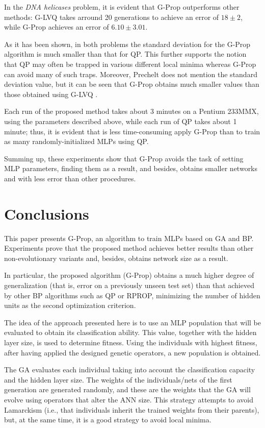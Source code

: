 \documentclass{elsart}
\begin{document}
In the \emph{DNA helicases} problem, it is evident that G-Prop outperforms other methods: G-LVQ \cite{heliNPL} takes arround 20 generations to achieve an error of $18 \pm 2$, while G-Prop  achieves an error of $6.10 \pm 3.01$.

As it has been shown, in both problems the standard deviation for the G-Prop algorithm is much smaller than that for QP. This further supports the notion that QP may often be trapped in various different local minima whereas G-Prop can avoid many of such traps. Moreover, Prechelt \cite{Prechelt94c} does not mention the standard deviation value, but it can be seen that G-Prop obtains much smaller values than those obtained using G-LVQ \cite{heliNPL}.

Each run of the proposed method takes about 3 minutes on a Pentium 233MMX, using the parameters described above, while each run of QP takes about 1 minute; thus, it is evident that is less time-consuming apply G-Prop than to train as many randomly-initialized MLPs using QP.

Summing up, these experiments show that G-Prop avoids the task of setting MLP parameters, finding them as a result, and besides, obtains smaller networks and with less error than other procedures.

\section{Conclusions}
\label{sec:conclus}


This paper presents G-Prop, an algorithm to train MLPs based on GA and BP. Experiments prove that the proposed method achieves better results than other non-evolutionary variants and, besides, obtains network size as a result.

In particular, the proposed algorithm (G-Prop) obtains a much higher degree of generalization (that is, error on a previously unseen test set) than that achieved by other BP algorithms such as QP or RPROP, minimizing the number of hidden units as the second optimization criterion.

The idea of the approach presented here is to use an MLP population that will be evaluated to obtain its classification ability. This value, together with the hidden layer size, is used to determine fitness. Using the individuals with highest fitness, after having applied the designed genetic operators, a new population is obtained.

The GA evaluates each individual taking into account the classification capacity and the hidden layer size. The weights of the individuals/nets of the first generation are generated randomly, and these are the weights that the GA will evolve using operators that alter the ANN size. 
This strategy attempts to avoid Lamarckism (i.e., that individuals inherit the trained weights from their parents), but, at the same time, it is a good strategy to avoid local minima.
\end{document}

